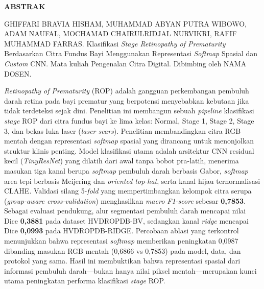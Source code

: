 
\clearpage
\thispagestyle{empty}

\begin{center}
{\fontsize{14pt}{17pt}\selectfont\bfseries ABSTRAK}
\end{center}

\vspace{6pt}

\noindent
GHIFFARI BRAVIA HISHAM, MUHAMMAD ABYAN PUTRA WIBOWO, ADAM NAUFAL,
MOCHAMAD CHAIRULRIDJAL NURVIKRI, RAFIF MUHAMMAD FARRAS.
Klasifikasi \textit{Stage Retinopathy of Prematurity} Berdasarkan Citra Fundus Bayi
Menggunakan Representasi \textit{Softmap} Spasial dan \textit{Custom} CNN.
Mata kuliah Pengenalan Citra Digital. Dibimbing oleh NAMA DOSEN.

\vspace{12pt}

\noindent
\textit{Retinopathy of Prematurity} (ROP) adalah gangguan perkembangan pembuluh darah retina
pada bayi prematur yang berpotensi menyebabkan kebutaan jika tidak terdeteksi sejak dini.
Penelitian ini membangun sebuah \textit{pipeline} klasifikasi \textit{stage} ROP dari citra
fundus bayi ke lima kelas: Normal, Stage 1, Stage 2, Stage 3, dan bekas luka laser
(\textit{laser scars}). Penelitian membandingkan citra RGB mentah dengan representasi
\textit{softmap} spasial yang dirancang untuk menonjolkan struktur klinis penting. Model
klasifikasi utama adalah arsitektur CNN residual kecil (\textit{TinyResNet}) yang dilatih dari
awal tanpa bobot pra-latih, menerima masukan tiga kanal berupa \textit{softmap} pembuluh darah
berbasis Gabor, \textit{softmap} area tepi berbasis Meijering dan \textit{oriented top-hat}, serta
kanal hijau ternormalisasi CLAHE. Validasi silang 5-\textit{fold} yang
mempertimbangkan kelompok citra serupa (\textit{group-aware cross-validation}) menghasilkan
\textit{macro F1-score} sebesar \textbf{0,7853}. Sebagai evaluasi pendukung, alur segmentasi
pembuluh darah mencapai nilai Dice \textbf{0,3881} pada dataset HVDROPDB-BV, sedangkan kanal
\textit{ridge} mencapai Dice \textbf{0,0993} pada HVDROPDB-RIDGE. Percobaan ablasi yang terkontrol menunjukkan bahwa
representasi \textit{softmap} memberikan peningkatan 0,0987 dibanding masukan RGB mentah
(0,6866 vs 0,7853) pada model, data, dan protokol yang sama. Hasil ini membuktikan bahwa
representasi spasial dari informasi pembuluh darah---bukan hanya nilai piksel mentah---merupakan
kunci utama peningkatan performa klasifikasi \textit{stage} ROP.

